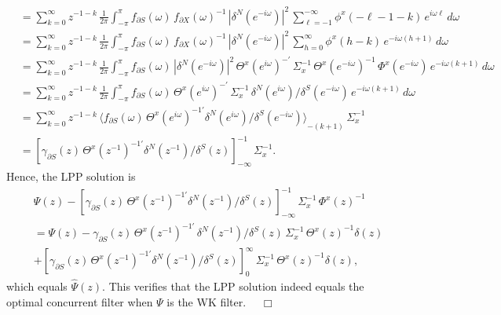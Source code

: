 \documentclass[a4paper]{book}
\begin{document}
\begin{align*}
 & =  \sum_{k = 0}^{\infty}    z^{-1-k} \,  \frac{1}{2 \pi} \int_{-\pi}^{\pi}  
 f_{ \partial S}(\omega)   \,  { f_{\partial X} (\omega)}^{-1} \, 
  {| \delta^N (e^{-i \omega}) |}^2 \, 
   \sum_{\ell = -1}^{-\infty}  \phi^x (-\ell-1-k)   \, e^{i \omega \ell} \, d\omega   \\
 & =  \sum_{k = 0}^{\infty}   z^{-1-k} \,  \frac{1}{2 \pi} \int_{-\pi}^{\pi}  
f_{ \partial S}(\omega)   \,  { f_{\partial X} (\omega)}^{-1} \, 
  {| \delta^N (e^{-i \omega}) |}^2 
\,  \sum_{h = 0}^{\infty}   \phi^x (h-k)   \, e^{-i \omega (h+1)} \, d\omega  \\
 & =   \sum_{k = 0}^{\infty}   z^{-1-k} \,  \frac{1}{2 \pi} \int_{-\pi}^{\pi}  
f_{ \partial S}(\omega)   \,  {| \delta^N (e^{-i \omega}) |}^2 \, 
     {  \Theta^x (e^{i \omega}) }^{- \prime} \, \Sigma_x^{-1} \,
    {  \Theta^x (e^{-i \omega}) }^{-1}
\,   \Phi^x (e^{-i \omega}) \, e^{-i \omega (k+1) }  \, d\omega  \\
 & =   \sum_{k = 0}^{\infty}   z^{-1-k} \,  \frac{1}{2 \pi} \int_{-\pi}^{\pi}  
f_{ \partial S}(\omega) \,  { \Theta^x (e^{i \omega}) }^{- \prime} \, \Sigma_x^{-1} \,
  \delta^N (e^{i \omega})/ \delta^S (e^{-i \omega})
\,  e^{-i \omega (k+1) }  \, d\omega  \\
 & =   \sum_{k = 0}^{\infty}   z^{-1-k} \,  { \langle    f_{ \partial S}(\omega) \, 
    {  \Theta^x (e^{i \omega}) }^{-1 \prime} 
    \delta^N (e^{i \omega})/ \delta^S (e^{-i \omega})  \rangle  }_{-(k+1) } 
     \, \Sigma_x^{-1}  \\
 & =   { [  \gamma_{\partial S} (z)  \, 
    {  \Theta^x (z^{-1}) }^{-1 \prime} 
    \delta^N (z^{-1})/ \delta^S (z) ]}_{-\infty}^{-1}  \, \Sigma_x^{-1}.
\end{align*}
 Hence, the LPP solution is
\begin{align*}
  & \Psi (z) - { [  \gamma_{\partial S} (z)  \, 
    {  \Theta^x (z^{-1}) }^{-1 \prime} \delta^N (z^{-1})/ \delta^S (z)
    ]}_{-\infty}^{-1}  \, \Sigma_x^{-1} \,     { \Phi^x (z) }^{-1}  \\
  & =  \Psi (z) -  \gamma_{\partial S} (z)  \, 
    {  \Theta^x (z^{-1}) }^{-1 \prime}  \, \delta^N (z^{-1})/ \delta^S (z) \,
     \Sigma_x^{-1} \,
    { \Theta^x (z) }^{-1} \delta (z)  \\
 &    +  { [  \gamma_{\partial S} (z)  \, 
    {  \Theta^x (z^{-1}) }^{-1 \prime}  \delta^N (z^{-1})/ \delta^S (z)
     ]}_{0}^{\infty}  \, \Sigma_x^{-1} \,
    { \Theta^x (z) }^{-1} \delta (z),
\end{align*}
  which equals $\widehat{\Psi} (z)$.
  This verifies that the LPP solution indeed equals the optimal concurrent
  filter when $\Psi $ is the WK filter.
$\quad \Box$
\end{document}

